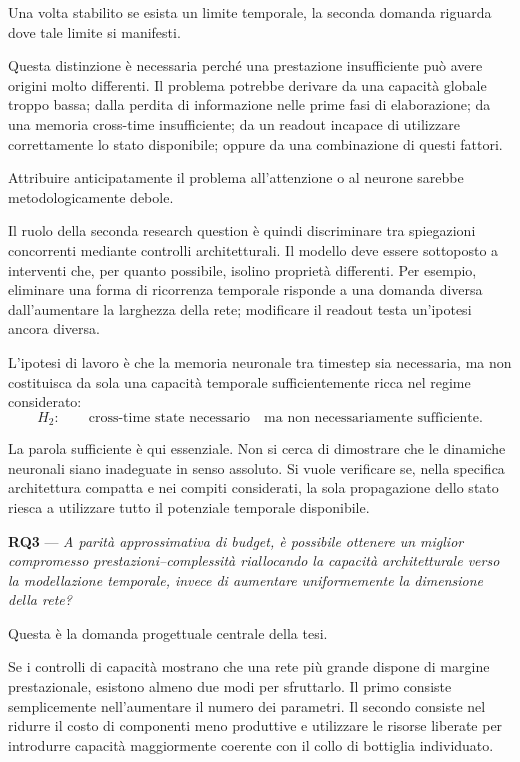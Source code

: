 Una volta stabilito se esista un limite temporale, la seconda domanda riguarda dove tale limite si manifesti.

Questa distinzione è necessaria perché una prestazione insufficiente può avere origini molto differenti. Il problema potrebbe derivare da una capacità globale troppo bassa; dalla perdita di informazione nelle prime fasi di elaborazione; da una memoria cross-time insufficiente; da un readout incapace di utilizzare correttamente lo stato disponibile; oppure da una combinazione di questi fattori.

Attribuire anticipatamente il problema all'attenzione o al neurone sarebbe metodologicamente debole.

Il ruolo della seconda research question è quindi discriminare tra spiegazioni concorrenti mediante controlli architetturali. Il modello deve essere sottoposto a interventi che, per quanto possibile, isolino proprietà differenti. Per esempio, eliminare una forma di ricorrenza temporale risponde a una domanda diversa dall'aumentare la larghezza della rete; modificare il readout testa un'ipotesi ancora diversa.

L'ipotesi di lavoro è che la memoria neuronale tra timestep sia necessaria, ma non costituisca da sola una capacità temporale sufficientemente ricca nel regime considerato:
\begin{equation}
\label{eq:h2}
H_2: \qquad \text{cross-time state necessario} \quad\text{ma non necessariamente sufficiente}.
\end{equation}

La parola sufficiente è qui essenziale. Non si cerca di dimostrare che le dinamiche neuronali siano inadeguate in senso assoluto. Si vuole verificare se, nella specifica architettura compatta e nei compiti considerati, la sola propagazione dello stato riesca a utilizzare tutto il potenziale temporale disponibile.

\vspace{0.8em}
\noindent\textbf{RQ3} --- \emph{A parità approssimativa di budget, è possibile ottenere un miglior compromesso prestazioni--complessità riallocando la capacità architetturale verso la modellazione temporale, invece di aumentare uniformemente la dimensione della rete?}

Questa è la domanda progettuale centrale della tesi.

Se i controlli di capacità mostrano che una rete più grande dispone di margine prestazionale, esistono almeno due modi per sfruttarlo. Il primo consiste semplicemente nell'aumentare il numero dei parametri. Il secondo consiste nel ridurre il costo di componenti meno produttive e utilizzare le risorse liberate per introdurre capacità maggiormente coerente con il collo di bottiglia individuato.

